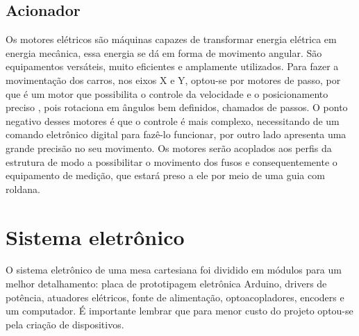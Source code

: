 \subsection{Acionador}

Os motores elétricos são máquinas capazes de transformar energia elétrica em energia mecânica, 
essa energia se dá em forma de movimento angular. São equipamentos versáteis, muito eficientes 
e amplamente utilizados. Para fazer a movimentação dos carros, nos eixos X e Y, optou-se por 
motores de passo, por que é um motor que possibilita o controle da velocidade e o posicionamento 
preciso , pois rotaciona em ângulos bem definidos, chamados de passos. O ponto negativo desses 
motores é que o controle é mais complexo, necessitando de um comando eletrônico digital para 
fazê-lo funcionar, por outro lado apresenta uma grande precisão no seu movimento. Os motores 
serão acoplados aos perfis da estrutura de modo a possibilitar o movimento dos fusos e consequentemente 
o equipamento de medição, que estará preso a ele por meio de uma guia com roldana. 

\section{Sistema eletrônico}

O sistema eletrônico de uma mesa cartesiana foi dividido em módulos para um melhor detalhamento: 
placa de prototipagem eletrônica Arduino, drivers de potência, atuadores elétricos, fonte de alimentação, 
optoacopladores, encoders e um computador. É importante lembrar que para menor custo do projeto optou-se 
pela criação de dispositivos.

